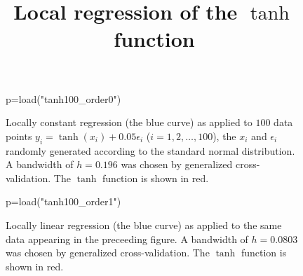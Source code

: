 \documentclass[11pt, reqno]{amsart}
\begin{document}
 
\title{Local regression of the $\tanh$ function}

\maketitle

\begin{figure}
  \begin{sagesilent}
     p=load("tanh100_order0")
  \end{sagesilent}
  \centering 
  \caption{Locally constant regression (the blue curve) as applied to $100$ data points
    $y_i=\tanh(x_i) + 0.05\epsilon_i$ ($i=1,2,\ldots,100$), the $x_i$ and
    $\epsilon_i$ randomly generated according to the standard normal
    distribution. A bandwidth of $h=0.196$ was chosen by generalized
    cross-validation. The $\tanh$ function is shown in red.}
\end{figure}

\begin{figure}
  \begin{sagesilent}
     p=load("tanh100_order1")
  \end{sagesilent}
  \centering 
  \caption{Locally linear regression (the blue curve) as applied to
    the same data appearing in the preceeding figure. A bandwidth of
    $h=0.0803$ was chosen by generalized cross-validation. The $\tanh$
    function is shown in red.}
\end{figure}
\end{document}
